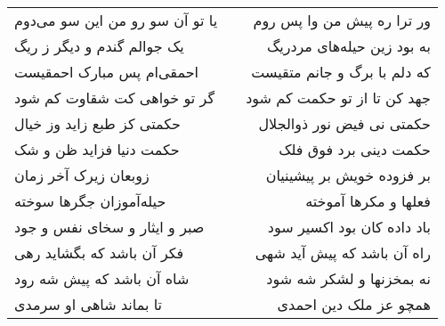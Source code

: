 \begin{center}
\begin{longtable}{l p{0.5cm} r}
یا تو آن سو رو من این سو می‌دوم
&&
ور ترا ره پیش من وا پس روم
\\
یک جوالم گندم و دیگر ز ریگ
&&
به بود زین حیله‌های مردریگ
\\
احمقی‌ام پس مبارک احمقیست
&&
که دلم با برگ و جانم متقیست
\\
گر تو خواهی کت شقاوت کم شود
&&
جهد کن تا از تو حکمت کم شود
\\
حکمتی کز طبع زاید وز خیال
&&
حکمتی نی فیض نور ذوالجلال
\\
حکمت دنیا فزاید ظن و شک
&&
حکمت دینی برد فوق فلک
\\
زوبعان زیرک آخر زمان
&&
بر فزوده خویش بر پیشینیان
\\
حیله‌آموزان جگرها سوخته
&&
فعلها و مکرها آموخته
\\
صبر و ایثار و سخای نفس و جود
&&
باد داده کان بود اکسیر سود
\\
فکر آن باشد که بگشاید رهی
&&
راه آن باشد که پیش آید شهی
\\
شاه آن باشد که پیش شه رود
&&
نه بمخزنها و لشکر شه شود
\\
تا بماند شاهی او سرمدی
&&
همچو عز ملک دین احمدی
\\
\end{longtable}
\end{center}
